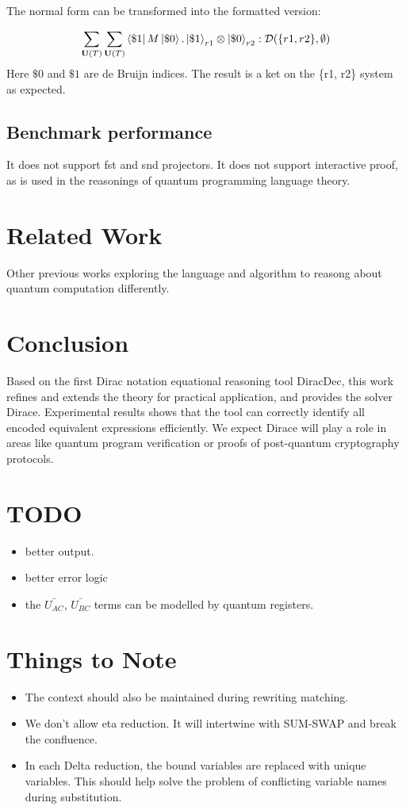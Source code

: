 \documentclass[runningheads]{llncs}
\begin{document}
The normal form can be transformed into the formatted version:

\[
\sum_{\mathbf{U}(T)} \sum_{\mathbf{U}(T)} \bra{\$1}M\ket{\$ 0} . \ket{\$1}_{r1} \otimes \ket{\$0}_{r2} : \mathcal{D}(\{r1, r2\}, \emptyset)
\]
Here $\$0$ and $\$1$ are de Bruijn indices. The result is a ket on the \{r1, r2\} system as expected.

\subsection{Benchmark performance}
It does not support fst and snd projectors.
It does not support interactive proof, as is used in the reasonings of quantum programming language theory.




\section{Related Work}

Other previous works exploring the language and algorithm to reasong about quantum computation differently.




\section{Conclusion}
Based on the first Dirac notation equational reasoning tool DiracDec, this work refines and extends the theory for practical application, and provides the solver Dirace. Experimental results shows that the tool can correctly identify all encoded equivalent expressions efficiently. 
We expect Dirace will play a role in areas like quantum program verification or proofs of post-quantum cryptography protocols.

\clearpage


\section{TODO}
\begin{itemize}
    \item better output.
    \item better error logic
    \item the $\bar{U_{AC}}$, $\bar{U_{BC}}$ terms can be modelled by quantum registers.
\end{itemize}

\section{Things to Note}
\begin{itemize}
    \item The context should also be maintained during rewriting matching.
    \item We don't allow eta reduction. It will intertwine with SUM-SWAP and break the confluence.
    \item In each Delta reduction, the bound variables are replaced with unique variables. This should help solve the problem of conflicting variable names during substitution.
\end{itemize}
\end{document}
